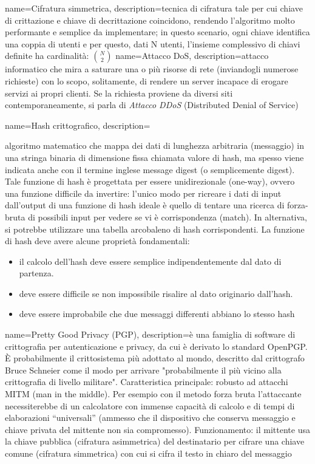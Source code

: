 {
	name={Cifratura simmetrica},
	description={tecnica di cifratura tale per cui chiave di crittazione e chiave di decrittazione coincidono, rendendo l’algoritmo molto performante e semplice da implementare; in questo scenario, ogni chiave identifica una coppia di utenti e per questo, dati N utenti, l’insieme complessivo di chiavi definite ha cardinalità: $\binom{N}{2}$}
}
{
	name={Attacco DoS},
	description={attacco informatico che mira a saturare una o più risorse di rete (inviandogli numerose richieste) con lo scopo, solitamente, di rendere un server incapace di erogare servizi ai propri clienti. Se la richiesta proviene da diversi siti contemporaneamente, si parla di \emph{Attacco DDoS} (Distributed Denial of Service)}
}
{
	name={Hash crittografico},
	description={algoritmo matematico che mappa dei dati di lunghezza arbitraria (messaggio) in una stringa binaria di dimensione fissa chiamata valore di hash, ma spesso viene indicata anche con il termine inglese message digest (o semplicemente digest). Tale funzione di hash è progettata per essere unidirezionale (one-way), ovvero una funzione difficile da invertire: l'unico modo per ricreare i dati di input dall'output di una funzione di hash ideale è quello di tentare una ricerca di forza-bruta di possibili input per vedere se vi è corrispondenza (match). In alternativa, si potrebbe utilizzare una tabella arcobaleno di hash corrispondenti. La funzione di hash deve avere alcune proprietà fondamentali:
		\begin{itemize}
			\item il calcolo dell'hash deve essere semplice indipendentemente dal dato di partenza.
			\item deve essere difficile se non impossibile risalire al dato originario dall'hash.
			\item deve essere improbabile che due messaggi differenti abbiano lo stesso hash
		\end{itemize} 
	}
}
%
{
	name={Pretty Good Privacy (PGP)},
	description={è una famiglia di software di crittografia per autenticazione e privacy, da cui è derivato lo standard OpenPGP. È probabilmente il crittosistema più adottato al mondo, descritto dal crittografo Bruce Schneier come il modo per arrivare "probabilmente il più vicino alla crittografia di livello militare". Caratteristica principale: robusto ad attacchi MITM (man in the middle). Per esempio con il metodo forza bruta l’attaccante necessiterebbe di un calcolatore con immense capacità di calcolo e di tempi di elaborazioni “universali” (ammesso che il dispositivo che conserva messaggio e chiave privata del mittente non sia compromesso). Funzionamento: il mittente usa la chiave pubblica (cifratura asimmetrica) del destinatario per cifrare una chiave comune (cifratura simmetrica) con cui si cifra il testo in chiaro del messaggio}
}
